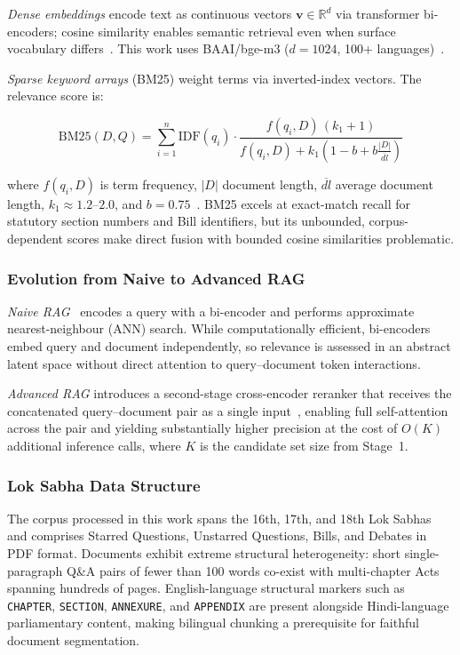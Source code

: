 \documentclass[conference]{IEEEtran}
\begin{document}
\emph{Dense embeddings} encode text as continuous vectors
$\mathbf{v} \in \mathbb{R}^d$ via transformer bi-encoders; cosine similarity
enables semantic retrieval even when surface vocabulary differs~\cite{lewis2020rag}.
This work uses BAAI/bge-m3 ($d=1024$, 100+ languages)~\cite{mrag_settings2024}.

\emph{Sparse keyword arrays} (BM25) weight terms via inverted-index vectors.
The relevance score is:

\begin{equation}
  \text{BM25}(D,Q) = \sum_{i=1}^{n} \text{IDF}(q_i) \cdot
  \frac{f(q_i,D)\,(k_1\!+\!1)}{f(q_i,D)+k_1\!\left(1-b+b\frac{|D|}{\overline{dl}}\right)}
  \label{eq:bm25}
\end{equation}

\noindent where $f(q_i, D)$ is term frequency, $|D|$ document length,
$\overline{dl}$ average document length, $k_1{\approx}1.2$--$2.0$, and
$b=0.75$~\cite{rag_framework2025}.
BM25 excels at exact-match recall for statutory section numbers and Bill
identifiers, but its unbounded, corpus-dependent scores make direct fusion
with bounded cosine similarities problematic.

\subsubsection{Evolution from Naive to Advanced RAG}

\emph{Naive RAG}~\cite{lewis2020rag} encodes a query with a bi-encoder and
performs approximate nearest-neighbour (ANN) search.
While computationally efficient, bi-encoders embed query and document
independently, so relevance is assessed in an abstract latent space without
direct attention to query--document token interactions.

\emph{Advanced RAG} introduces a second-stage cross-encoder reranker that
receives the concatenated query--document pair as a single input~\cite{mrag_settings2024},
enabling full self-attention across the pair and yielding substantially higher
precision at the cost of $O(K)$ additional inference calls, where $K$ is the
candidate set size from Stage~1.

\subsubsection{Lok Sabha Data Structure}

The corpus processed in this work spans the 16th, 17th, and 18th Lok Sabhas
and comprises Starred Questions, Unstarred Questions, Bills, and Debates in PDF format.
Documents exhibit extreme structural heterogeneity: short single-paragraph
Q\&A pairs of fewer than 100 words co-exist with multi-chapter Acts spanning
hundreds of pages.
English-language structural markers such as \texttt{CHAPTER}, \texttt{SECTION},
\texttt{ANNEXURE}, and \texttt{APPENDIX} are present alongside
Hindi-language parliamentary content, making bilingual chunking a prerequisite
for faithful document segmentation.
\end{document}
